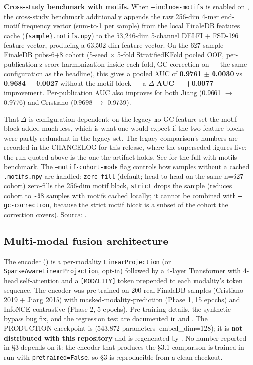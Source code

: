 \documentclass[11pt]{article}
\begin{document}
\textbf{Cross-study benchmark with motifs.} When \texttt{--include-motifs} is enabled on , the cross-study benchmark additionally appends the raw 256-dim 4-mer end-motif frequency vector (sum-to-1 per sample) from the local FinaleDB features cache (\texttt{\{sample\}.motifs.npy}) to the 63,246-dim 5-channel DELFI + FSD-196 feature vector, producing a 63,502-dim feature vector. On the 627-sample FinaleDB pubs-6+8 cohort (5-seed $\times$ 5-fold StratifiedKFold pooled OOF, per-publication z-score harmonization inside each fold, GC correction on --- the same configuration as the headline), this gives a pooled AUC of \textbf{0.9761 $\pm$ 0.0030} vs \textbf{0.9684 $\pm$ 0.0027} without the motif block --- a \textbf{$\Delta$ AUC =\allowbreak{} +0.0077} improvement. Per-publication AUC also improves for both Jiang (0.9661 $\rightarrow$ 0.9776) and Cristiano (0.9698 $\rightarrow$ 0.9739).

That $\Delta$ is configuration-dependent: on the legacy no-GC feature set the motif block added much less, which is what one would expect if the two feature blocks were partly redundant in the legacy set. The legacy comparison's numbers are recorded in the CHANGELOG for this release, where the superseded figures live; the run quoted above is the one the artifact holds. See  for the full with-motifs benchmark. The \texttt{--motif-cohort-mode} flag controls how samples without a cached \texttt{.motifs.npy} are handled: \texttt{zero\_\allowbreak{}fill} (default; head-to-head on the same n=\allowbreak{}627 cohort) zero-fills the 256-dim motif block, \texttt{strict} drops the sample (reduces cohort to \textasciitilde{}98 samples with motifs cached locally; it cannot be combined with \texttt{--gc-correction}, because the strict motif block is a subset of the cohort the correction covers). Source: .

\subsection{Multi-modal fusion architecture}
The encoder () is a per-modality \texttt{LinearProjection} (or \texttt{SparseAwareLinearProjection}, opt-in) followed by a 4-layer Transformer with 4-head self-attention and a \texttt{[MODALITY]} token prepended to each modality's token sequence. The encoder was pre-trained on 200 real FinaleDB samples (Cristiano 2019 + Jiang 2015) with masked-modality-prediction (Phase 1, 15 epochs) and InfoNCE contrastive (Phase 2, 5 epochs). Pre-training details, the synthetic-bypass bug fix, and the regression test are documented in  and . The PRODUCTION checkpoint is  (543,872 parameters, embed\_dim=\allowbreak{}128); it is \textbf{not distributed with this repository} and is regenerated by . No number reported in \S{}3 depends on it: the encoder that produces the \S{}3.1 comparison is trained in-run with \texttt{pretrained=False}, so \S{}3 is reproducible from a clean checkout.
\end{document}
